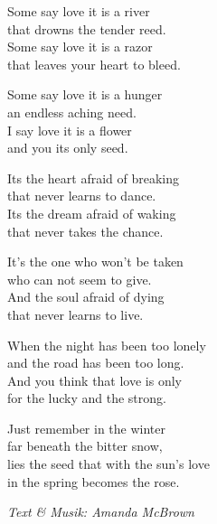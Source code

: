 \vspace{10pt}
Some say love it is a river\\
that drowns the tender reed.\\
Some say love it is a razor\\
that leaves your heart to bleed.\par
\vspace{8pt}
Some say love it is a hunger\\
an endless aching need.\\
I say love it is a flower\\
and you its only seed.\par
\vspace{8pt}
Its the heart afraid of breaking\\
that never learns to dance.\\
Its the dream afraid of waking\\
that never takes the chance.\par
\vspace{8pt}
It's the one who won't be taken\\
who can not seem to give.\\
And the soul afraid of dying\\
that never learns to live.\par
\vspace{8pt}
When the night has been too lonely\\
and the road has been too long.\\
And you think that love is only\\
for the lucky and the strong.\par
\vspace{8pt}
Just remember in the winter\\
far beneath the bitter snow,\\
lies the seed that with the sun's love\\
in the spring becomes the rose.\par
\vspace{10pt}
{\footnotesize\textit{Text \& Musik: Amanda McBrown}}
